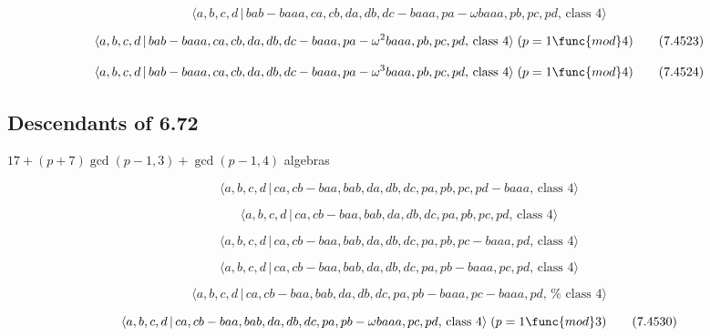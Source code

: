 \documentclass[10pt]{article}
\begin{document}
\begin{equation}
\langle a,b,c,d\,|\,bab-baaa,ca,cb,da,db,dc-baaa,pa-\omega baaa,pb,pc,pd,\,%
\text{class }4\rangle  \tag{7.4522}
\end{equation}

\begin{equation}
\langle a,b,c,d\,|\,bab-baaa,ca,cb,da,db,dc-baaa,pa-\omega
^{2}baaa,pb,pc,pd,\,\text{class }4\rangle \;(p=1\func{mod}4)  \tag{7.4523}
\end{equation}

\begin{equation}
\langle a,b,c,d\,|\,bab-baaa,ca,cb,da,db,dc-baaa,pa-\omega
^{3}baaa,pb,pc,pd,\,\text{class }4\rangle \;(p=1\func{mod}4)  \tag{7.4524}
\end{equation}

\subsection{Descendants of 6.72}

$17+(p+7)\gcd (p-1,3)+\gcd (p-1,4)$ algebras

\begin{equation}
\langle a,b,c,d\,|\,ca,cb-baa,bab,da,db,dc,pa,pb,pc,pd-baaa,\,\text{class }%
4\rangle  \tag{7.4525}
\end{equation}

\begin{equation}
\langle a,b,c,d\,|\,ca,cb-baa,bab,da,db,dc,pa,pb,pc,pd,\,\text{class }%
4\rangle  \tag{7.4526}
\end{equation}

\begin{equation}
\langle a,b,c,d\,|\,ca,cb-baa,bab,da,db,dc,pa,pb,pc-baaa,pd,\,\text{class }%
4\rangle  \tag{7.4527}
\end{equation}

\begin{equation}
\langle a,b,c,d\,|\,ca,cb-baa,bab,da,db,dc,pa,pb-baaa,pc,pd,\,\text{class }%
4\rangle  \tag{7.4528}
\end{equation}

\begin{equation}
\langle a,b,c,d\,|\,ca,cb-baa,bab,da,db,dc,pa,pb-baaa,pc-baaa,pd,\,\text{%
class }4\rangle  \tag{7.4529}
\end{equation}

\begin{equation}
\langle a,b,c,d\,|\,ca,cb-baa,bab,da,db,dc,pa,pb-\omega baaa,pc,pd,\,\text{%
class }4\rangle \;(p=1\func{mod}3)  \tag{7.4530}
\end{equation}
\end{document}
